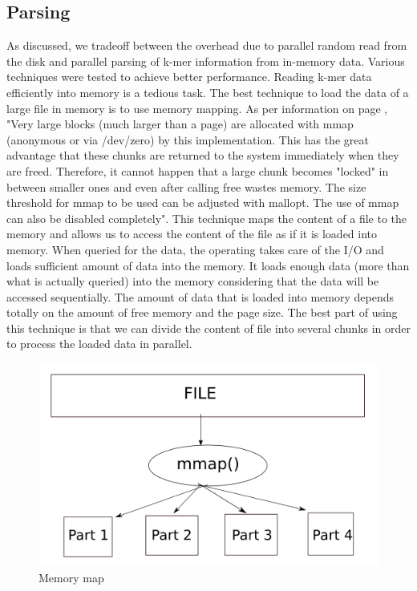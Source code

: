 \label{key}\documentclass[plainarticle, english ,zihtitle,final,hyperref,utf8]{zihpub}
\begin{document}
\subsection{Parsing}
As discussed, we tradeoff between the overhead due to parallel random read from the disk and parallel parsing of k-mer information from in-memory data. Various techniques were tested to achieve better performance. Reading k-mer data efficiently into memory is a tedious task. The best technique to load the data of a large file in memory is to use memory mapping. 
As per information on page \cite{mmap}, "Very large blocks (much larger than a page) are allocated with mmap (anonymous or via /dev/zero) by this implementation. This has the great advantage that these chunks are returned to the system immediately when they are freed. Therefore, it cannot happen that a large chunk becomes "locked" in between smaller ones and even after calling free wastes memory. The size threshold for mmap to be used can be adjusted with mallopt. The use of mmap can also be disabled completely". This technique maps the content of a file to the memory and allows us to access the content of the file as if it is loaded into memory. When queried for the data, the operating takes care of the I/O and loads sufficient amount of data into the memory. It loads enough data (more than what is actually queried) into the memory considering that the data will be accessed sequentially. The amount of data that is loaded into memory depends totally on the amount of free memory and the page size. The best part of using this technique is that we can divide the content of file into several chunks in order to process the loaded data in parallel.
\begin{figure}[h]
\center
\includegraphics[scale=0.50]{mmapi}
\caption{Memory map}
\label{mmapid}
\end{figure}
\end{document}
